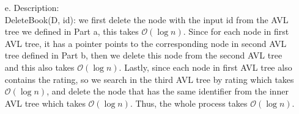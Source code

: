 \documentclass[10pt]{article}
\begin{document}
\begin{enumerate}
\item[e.]Description:\\
DeleteBook(D, id): we first delete the node with the input id from the AVL tree we defined in Part a, this takes $\mathcal{O}(\log n)$. Since for each node in first AVL tree, it has a pointer points to the corresponding node in second AVL tree defined in Part b, then we delete this node from the second AVL tree and this also takes $\mathcal{O}(\log n)$. Lastly, since each node in first AVL tree also contains the rating, so we search in the third AVL tree by rating which takes $\mathcal{O}(\log n)$, and delete the node that has the same identifier from the inner AVL tree which takes $\mathcal{O}(\log n)$. Thus, the whole process takes $\mathcal{O}(\log n)$.


\end{enumerate}
\end{document}
